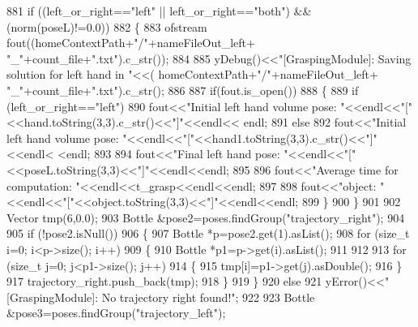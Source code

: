 \begin{DoxyCode}
881     \textcolor{keywordflow}{if} ((left_or_right==\textcolor{stringliteral}{"left"} || left_or_right==\textcolor{stringliteral}{"both"}) && (norm(poseL)!=0.0))
882     \{
883         ofstream fout((homeContextPath+\textcolor{stringliteral}{"/"}+nameFileOut_left+ \textcolor{stringliteral}{"\_"}+count\_file+\textcolor{stringliteral}{".txt"}).c\_str());
884 
885         yDebug()<<\textcolor{stringliteral}{"[GraspingModule]: Saving solution for left hand in "}<<(
      homeContextPath+\textcolor{stringliteral}{"/"}+nameFileOut_left+ \textcolor{stringliteral}{"\_"}+count\_file+\textcolor{stringliteral}{".txt"}).c\_str();
886 
887         \textcolor{keywordflow}{if}(fout.is\_open())
888         \{
889             \textcolor{keywordflow}{if} (left_or_right==\textcolor{stringliteral}{"left"})
890                 fout<<\textcolor{stringliteral}{"Initial left hand volume pose: "}<<endl<<\textcolor{stringliteral}{"["}<<hand.toString(3,3).c\_str()<<\textcolor{stringliteral}{"]"}<<endl<<
      endl;
891             \textcolor{keywordflow}{else}
892                 fout<<\textcolor{stringliteral}{"Initial left hand volume pose: "}<<endl<<\textcolor{stringliteral}{"["}<<hand1.toString(3,3).c\_str()<<\textcolor{stringliteral}{"]"}<<endl<
      <endl;
893 
894             fout<<\textcolor{stringliteral}{"Final left hand pose: "}<<endl<<\textcolor{stringliteral}{"["}<<poseL.toString(3,3)<<\textcolor{stringliteral}{"]"}<<endl<<endl;
895 
896             fout<<\textcolor{stringliteral}{"Average time for computation: "}<<endl<<t\_grasp<<endl<<endl;
897 
898             fout<<\textcolor{stringliteral}{"object: "}<<endl<<\textcolor{stringliteral}{"["}<<\textcolor{keywordtype}{object}.toString(3,3)<<\textcolor{stringliteral}{"]"}<<endl<<endl;
899         \}
900     \}
901 
902     Vector tmp(6,0.0);
903     Bottle &pose2=poses.findGroup(\textcolor{stringliteral}{"trajectory\_right"});
904 
905     \textcolor{keywordflow}{if} (!pose2.isNull())
906     \{
907         Bottle *p=pose2.get(1).asList();
908         \textcolor{keywordflow}{for} (\textcolor{keywordtype}{size\_t} i=0; i<p->size(); i++)
909         \{
910             Bottle *p1=p->get(i).asList();
911 
912 
913             \textcolor{keywordflow}{for} (\textcolor{keywordtype}{size\_t} j=0; j<p1->size(); j++)
914             \{
915                 tmp[i]=p1->get(j).asDouble();
916             \}
917             trajectory_right.push\_back(tmp);
918         \}
919     \}
920     \textcolor{keywordflow}{else}
921         yError()<<\textcolor{stringliteral}{"[GraspingModule]: No trajectory right found!"};
922 
923     Bottle &pose3=poses.findGroup(\textcolor{stringliteral}{"trajectory\_left"});

\end{DoxyCode}
